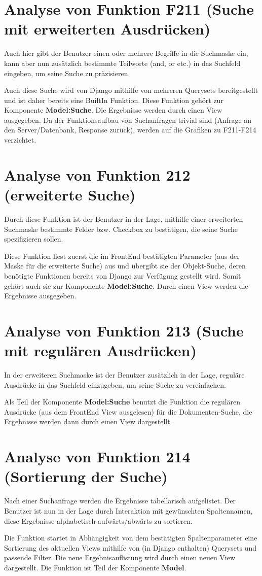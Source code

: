 \section{Analyse von Funktion F211 (Suche mit erweiterten Ausdrücken)}
Auch hier gibt der Benutzer einen oder mehrere Begriffe in die Suchmaske ein, kann aber nun zusätzlich bestimmte Teilworte (and, or etc.) in das Suchfeld eingeben, um seine Suche zu präzisieren.  

Auch diese Suche wird von Django mithilfe von mehreren Querysets bereitgestellt und ist daher bereits eine BuiltIn Funktion. Diese Funktion gehört zur Komponente \textbf{Model:Suche}. Die Ergebnisse werden durch einen View ausgegeben. 
Da der Funktionsaufbau von Suchanfragen trivial sind (Anfrage an den Server/Datenbank, Response zurück), werden auf die Grafiken zu F211-F214 verzichtet.   

\section{Analyse von Funktion 212 (erweiterte Suche)}
Durch diese Funktion ist der Benutzer in der Lage, mithilfe einer erweiterten Suchmaske bestimmte Felder bzw. Checkbox zu bestätigen, die seine Suche spezifizieren sollen.
    
Diese Funktion liest zuerst die im FrontEnd bestätigten Parameter (aus der Maske für die erweiterte Suche) aus und übergibt sie der Objekt-Suche, deren benötigte Funktionen bereits von Django zur Verfügung gestellt wird. Somit gehört auch sie zur Komponente \textbf{Model:Suche}. Durch einen View werden die Ergebnisse ausgegeben. 

\section{Analyse von Funktion 213 (Suche mit regulären Ausdrücken)}
In der erweiteren Suchmaske ist der Benutzer zusätzlich in der Lage, reguläre Ausdrücke in das Suchfeld einzugeben, um seine Suche zu vereinfachen. 

Als Teil der Komponente \textbf{Model:Suche} benutzt die Funktion die regulären Ausdrücke (aus dem FrontEnd View ausgelesen) für die Dokumenten-Suche, die Ergebnisse werden dann durch einen View dargestellt.
 
\section{Analyse von Funktion 214 (Sortierung der Suche)}
Nach einer Suchanfrage werden die Ergebnisse tabellarisch aufgelistet. Der Benutzer ist nun in der Lage durch Interaktion mit gewünschten Spaltennamen, diese Ergebnisse alphabetisch aufwärts/abwärts zu sortieren. 

Die Funktion startet in Abhängigkeit von dem bestätigten Spaltenparameter eine Sortierung des aktuellen Views mithilfe von (in Django enthalten) Querysets und passende Filter. Die neue Ergebnisauflistung wird durch einen neuen View dargestellt. Die Funktion ist Teil der Komponente \textbf{Model}. 




 